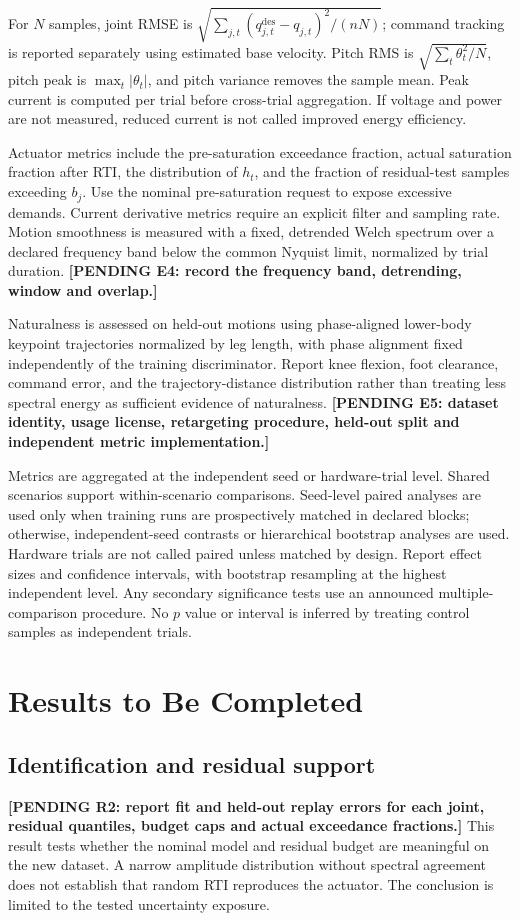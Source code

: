 \documentclass[11pt,a4paper]{article}
\newcommand{\pending}[1]{\textbf{[PENDING #1]}}
\begin{document}
For $N$ samples, joint RMSE is $\sqrt{\sum_{j,t}(q^{\mathrm{des}}_{j,t}-q_{j,t})^2/(nN)}$; command tracking is reported separately using estimated base velocity. Pitch RMS is $\sqrt{\sum_t\theta_t^2/N}$, pitch peak is $\max_t|\theta_t|$, and pitch variance removes the sample mean. Peak current is computed per trial before cross-trial aggregation. If voltage and power are not measured, reduced current is not called improved energy efficiency.

Actuator metrics include the pre-saturation exceedance fraction, actual saturation fraction after RTI, the distribution of $h_t$, and the fraction of residual-test samples exceeding $b_j$. Use the nominal pre-saturation request to expose excessive demands. Current derivative metrics require an explicit filter and sampling rate. Motion smoothness is measured with a fixed, detrended Welch spectrum over a declared frequency band below the common Nyquist limit, normalized by trial duration. \pending{E4: record the frequency band, detrending, window and overlap.}

Naturalness is assessed on held-out motions using phase-aligned lower-body keypoint trajectories normalized by leg length, with phase alignment fixed independently of the training discriminator. Report knee flexion, foot clearance, command error, and the trajectory-distance distribution rather than treating less spectral energy as sufficient evidence of naturalness. \pending{E5: dataset identity, usage license, retargeting procedure, held-out split and independent metric implementation.}

Metrics are aggregated at the independent seed or hardware-trial level. Shared scenarios support within-scenario comparisons. Seed-level paired analyses are used only when training runs are prospectively matched in declared blocks; otherwise, independent-seed contrasts or hierarchical bootstrap analyses are used. Hardware trials are not called paired unless matched by design. Report effect sizes and confidence intervals, with bootstrap resampling at the highest independent level. Any secondary significance tests use an announced multiple-comparison procedure. No $p$ value or interval is inferred by treating control samples as independent trials.

\section{Results to Be Completed}
\subsection{Identification and residual support}
\pending{R2: report fit and held-out replay errors for each joint, residual quantiles, budget caps and actual exceedance fractions.} This result tests whether the nominal model and residual budget are meaningful on the new dataset. A narrow amplitude distribution without spectral agreement does not establish that random RTI reproduces the actuator. The conclusion is limited to the tested uncertainty exposure.
\end{document}

